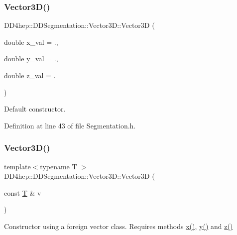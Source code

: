 \subsubsection{\texorpdfstring{Vector3\+D()}{Vector3D()}\hspace{0.1cm}{\footnotesize\ttfamily [1/5]}}
{\footnotesize\ttfamily D\+D4hep\+::\+D\+D\+Segmentation\+::\+Vector3\+D\+::\+Vector3D (\begin{DoxyParamCaption}\item[{double}]{x\+\_\+val = {.},  }\item[{double}]{y\+\_\+val = {.},  }\item[{double}]{z\+\_\+val = {.} }\end{DoxyParamCaption})\hspace{0.3cm}{\ttfamily [inline]}}



Default constructor. 



Definition at line 43 of file Segmentation.\+h.

\hypertarget{struct_d_d4hep_1_1_d_d_segmentation_1_1_vector3_d_a88b83b60c26ecc24cd55bdfad778b866}{}\label{struct_d_d4hep_1_1_d_d_segmentation_1_1_vector3_d_a88b83b60c26ecc24cd55bdfad778b866} 
\subsubsection{\texorpdfstring{Vector3\+D()}{Vector3D()}\hspace{0.1cm}{\footnotesize\ttfamily [2/5]}}
{\footnotesize\ttfamily template$<$typename T $>$ \\
D\+D4hep\+::\+D\+D\+Segmentation\+::\+Vector3\+D\+::\+Vector3D (\begin{DoxyParamCaption}\item[{const \hyperlink{class_t}{T} \&}]{v }\end{DoxyParamCaption})\hspace{0.3cm}{\ttfamily [inline]}}



Constructor using a foreign vector class. Requires methods \hyperlink{struct_d_d4hep_1_1_d_d_segmentation_1_1_vector3_d_adadba77bba380b6ab14b051a2d6456eb}{x()}, \hyperlink{struct_d_d4hep_1_1_d_d_segmentation_1_1_vector3_d_ad453bb8f29162b62eba0e627d124814d}{y()} and \hyperlink{struct_d_d4hep_1_1_d_d_segmentation_1_1_vector3_d_a9b9ed1ddd7b4d7a559e25f8e29848de6}{z()} 



